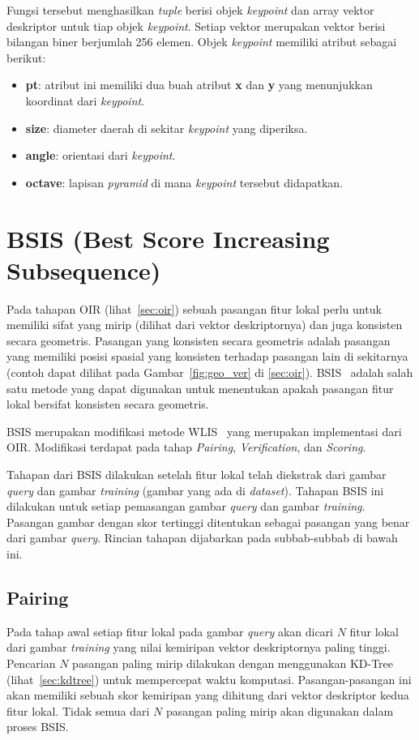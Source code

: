 Fungsi tersebut menghasilkan \textit{tuple} berisi objek \textit{keypoint} dan array vektor deskriptor untuk tiap objek \textit{keypoint}. Setiap vektor merupakan vektor berisi bilangan biner berjumlah 256 elemen. Objek \textit{keypoint} memiliki atribut sebagai berikut:
\begin{itemize}
	\item \textbf{pt}: atribut ini memiliki dua buah atribut \textbf{x} dan \textbf{y} yang menunjukkan koordinat dari \textit{keypoint}.
	\item \textbf{size}: diameter daerah di sekitar \textit{keypoint} yang diperiksa.
	\item \textbf{angle}: orientasi dari \textit{keypoint}.
	\item \textbf{octave}: lapisan \textit{pyramid} di mana \textit{keypoint} tersebut didapatkan.
\end{itemize}

\section{BSIS (Best Score Increasing Subsequence)}
\label{sec:bsis}
Pada tahapan OIR (lihat~\ref{sec:oir}) sebuah pasangan fitur lokal perlu untuk memiliki sifat yang mirip (dilihat dari vektor deskriptornya) dan juga konsisten secara geometris. Pasangan yang konsisten secara geometris adalah pasangan yang memiliki posisi spasial yang konsisten terhadap pasangan lain di sekitarnya (contoh dapat dilihat pada Gambar~\ref{fig:geo_ver} di \ref{sec:oir}). BSIS~\cite{kusuma2019geometric} adalah salah satu metode yang dapat digunakan untuk menentukan apakah pasangan fitur lokal bersifat konsisten secara geometris. 

BSIS merupakan modifikasi metode WLIS~\cite{kusuma2012appearance} yang merupakan implementasi dari OIR. Modifikasi terdapat pada tahap \textit{Pairing}, \textit{Verification}, dan \textit{Scoring}. 

Tahapan dari BSIS dilakukan setelah fitur lokal telah diekstrak dari gambar \textit{query} dan gambar \textit{training} (gambar yang ada di \textit{dataset}). Tahapan BSIS ini dilakukan untuk setiap pemasangan gambar \textit{query} dan gambar \textit{training}. Pasangan gambar dengan skor tertinggi ditentukan sebagai pasangan yang benar dari gambar \textit{query}. Rincian tahapan dijabarkan pada subbab-subbab di bawah ini. 

\subsection{Pairing}
\label{subsec:bsis_pairing}
Pada tahap awal setiap fitur lokal pada gambar \textit{query} akan dicari $N$ fitur lokal dari gambar \textit{training} yang nilai kemiripan vektor deskriptornya paling tinggi. Pencarian $N$ pasangan paling mirip dilakukan dengan menggunakan KD-Tree (lihat~\ref{sec:kdtree}) untuk mempercepat waktu komputasi. Pasangan-pasangan ini akan memiliki sebuah skor kemiripan yang dihitung dari vektor deskriptor kedua fitur lokal. Tidak semua dari $N$ pasangan paling mirip akan digunakan dalam proses BSIS. 

